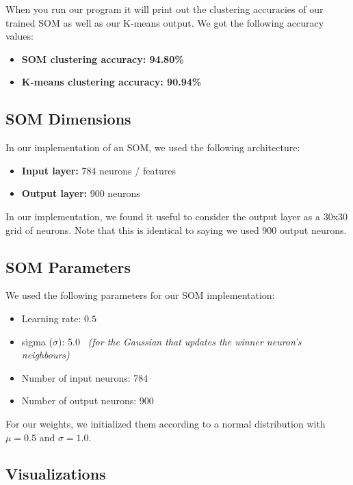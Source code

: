 \documentclass[11pt]{article}
\providecommand{\tightlist}{%
  \setlength{\itemsep}{0pt}\setlength{\parskip}{0pt}}
\begin{document}
When you run our program it will print out the clustering accuracies of
our trained SOM as well as our K-means output. We got the following
accuracy values:

\begin{itemize}
	\tightlist
	\item \textbf{SOM clustering accuracy: 94.80\%}
	\item \textbf{K-means clustering accuracy: 90.94\%}
\end{itemize}

    \subsection{SOM Dimensions}\label{som-dimensions}

In our implementation of an SOM, we used the following architecture:

\begin{itemize}
\tightlist
\item
  \textbf{Input layer:} 784 neurons / features
\item
  \textbf{Output layer:} 900 neurons
\end{itemize}

In our implementation, we found it useful to consider the output layer
as a 30x30 grid of neurons. Note that this is identical to saying we
used 900 output neurons.

    \subsection{SOM Parameters}\label{som-parameters}

We used the following parameters for our SOM implementation:

\begin{itemize}
	\tightlist
	\item Learning rate: $0.5$
	\item sigma (\(\sigma\)): 5.0 \ \textit{(for the Gaussian that updates the winner neuron's neighbours)}
	\item Number of input neurons: 784
	\item Number of output neurons: 900
\end{itemize}

For our weights, we initialized them according to a normal distribution
with \(\mu = 0.5\) and \(\sigma = 1.0\).

\pagebreak

\subsection{Visualizations}\label{visualizations}
\end{document}
